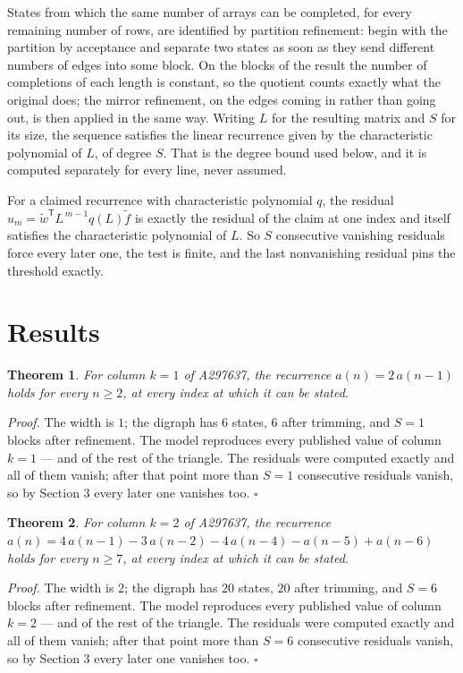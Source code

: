 \documentclass[11pt]{article}
\newtheorem{theorem}{Theorem}
\theoremstyle{definition}
\begin{document}
States from which the same number of arrays can be completed, for every remaining number of rows, are identified by partition refinement: begin with the partition by acceptance and separate two states as soon as they send different numbers of edges into some block. On the blocks of the result the number of completions of each length is constant, so the quotient counts exactly what the original does; the mirror refinement, on the edges coming in rather than going out, is then applied in the same way. Writing $L$ for the resulting matrix and $S$ for its size, the sequence satisfies the linear recurrence given by the characteristic polynomial of $L$, of degree $S$. That is the degree bound used below, and it is computed separately for every line, never assumed.

For a claimed recurrence with characteristic polynomial $q$, the residual $u_m = \tilde w^{\mathsf T}L^{\,m-1}q(L)\tilde f$ is exactly the residual of the claim at one index and itself satisfies the characteristic polynomial of $L$. So $S$ consecutive vanishing residuals force every later one, the test is finite, and the last nonvanishing residual pins the threshold exactly.

\section{Results}

\begin{theorem} For column $k = 1$ of A297637, the recurrence $a(n) = 2\,a(n-1)$ holds for every $n \ge 2$, at every index at which it can be stated.\end{theorem}

{\itshape Proof.} The width is $1$; the digraph has $6$ states, $6$ after trimming, and $S = 1$ blocks after refinement. The model reproduces every published value of column $k = 1$ --- and of the rest of the triangle. The residuals were computed exactly and all of them vanish; after that point more than $S = 1$ consecutive residuals vanish, so by Section 3 every later one vanishes too. $\square$

\begin{theorem} For column $k = 2$ of A297637, the recurrence $a(n) = 4\,a(n-1) - 3\,a(n-2) - 4\,a(n-4) - a(n-5) + a(n-6)$ holds for every $n \ge 7$, at every index at which it can be stated.\end{theorem}

{\itshape Proof.} The width is $2$; the digraph has $20$ states, $20$ after trimming, and $S = 6$ blocks after refinement. The model reproduces every published value of column $k = 2$ --- and of the rest of the triangle. The residuals were computed exactly and all of them vanish; after that point more than $S = 6$ consecutive residuals vanish, so by Section 3 every later one vanishes too. $\square$
\end{document}
